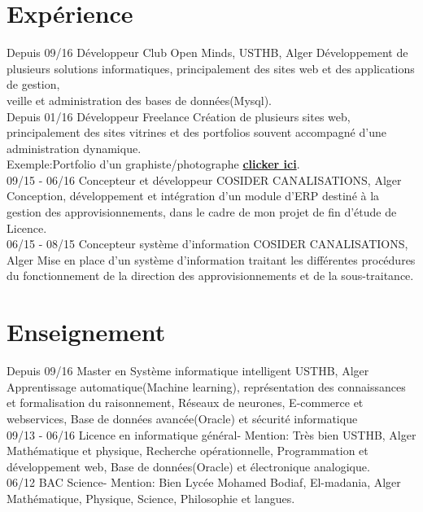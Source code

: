 \documentclass[]{friggeri-cv}
\begin{document}
\section{Expérience}
\begin{entrylist}
  \entry
    {Depuis 09/16}
    {Développeur}
    {Club Open Minds, USTHB, Alger}
    {Développement de plusieurs solutions informatiques, principalement des sites web et des applications de gestion,\\veille et administration des bases de données(Mysql).\\}
  \entry
    {Depuis 01/16}
    {Développeur Freelance}
    {}
    {Création de plusieurs sites web, principalement des sites vitrines et des portfolios souvent accompagné d'une administration dynamique.\\
    Exemple:Portfolio d'un graphiste/photographe \href{http://www.samirouferhat.com/}{\textbf{clicker ici}}.\\}
  \entry
    {09/15 - 06/16}
    {Concepteur et développeur}
    {COSIDER CANALISATIONS, Alger}
    {Conception, développement et intégration d'un module d'ERP destiné à la gestion des approvisionnements, dans le cadre de mon projet de fin d'étude de Licence.\\}
  \entry
    {06/15 - 08/15}
    {Concepteur système d'information}
    {COSIDER CANALISATIONS, Alger}
    {Mise en place d'un système d'information traitant les différentes procédures du fonctionnement de la direction des approvisionnements et de la sous-traitance.\\}
\end{entrylist}
\vspace{1cm}
\section{Enseignement}
\begin{entrylist}
  \entry
    {Depuis 09/16}
    {Master en  Système informatique intelligent}
    {USTHB, Alger}
    {Apprentissage automatique(Machine learning), représentation des connaissances et formalisation du raisonnement, Réseaux de neurones, E-commerce et webservices, Base de données avancée(Oracle) et sécurité informatique\\}
  \entry
    {09/13 - 06/16}
    {Licence en informatique général- Mention: Très bien}
    {USTHB, Alger}
    {Mathématique et physique, Recherche opérationnelle, Programmation et développement web,  Base de données(Oracle) et électronique analogique.\\}
  \entry
    {06/12}
    {BAC Science- Mention: Bien}
    {Lycée Mohamed Bodiaf, El-madania, Alger}
    {Mathématique, Physique, Science, Philosophie et langues.}
\end{entrylist}
\end{document}
